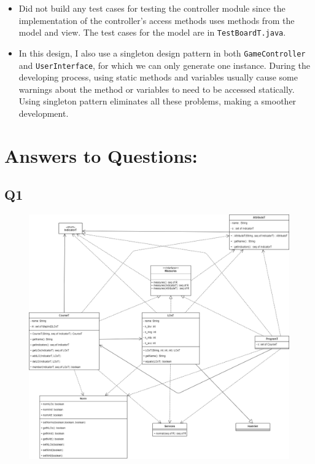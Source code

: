 \documentclass[12pt]{article}
\begin{document}
\begin{itemize}
\item Did not build any test cases for testing the controller module since the implementation of the controller's access methods uses methods from the model and view. The test cases for the model are in \verb|TestBoardT.java|.
\item In this design, I also use a singleton design pattern in both \verb|GameController| and \verb|UserInterface|, for which we can only generate one instance. During the developing process, using static methods and variables usually cause some warnings about the method or variables to need to be accessed statically. Using singleton pattern eliminates all these problems, making a smoother development.
\end{itemize}

\newpage
\section*{Answers to Questions:}
\subsection*{Q1}

\begin{figure}[hbt!]
  \centering
  \includegraphics[width=1.0\textwidth]{UML.png}
\end{figure}

\newpage
\end{document}
